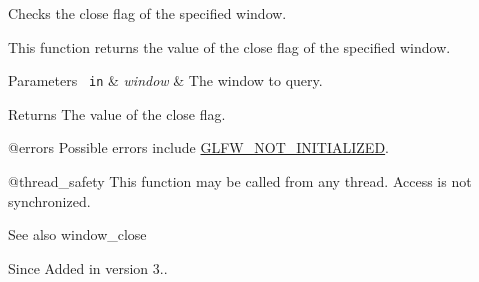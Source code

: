 Checks the close flag of the specified window. 

This function returns the value of the close flag of the specified window.


\begin{DoxyParams}[1]{Parameters}
\mbox{\texttt{ in}}  & {\em window} & The window to query. \\
\hline
\end{DoxyParams}
\begin{DoxyReturn}{Returns}
The value of the close flag.
\end{DoxyReturn}
@errors Possible errors include \mbox{\hyperlink{group__errors_ga2374ee02c177f12e1fa76ff3ed15e14a}{G\+L\+F\+W\+\_\+\+N\+O\+T\+\_\+\+I\+N\+I\+T\+I\+A\+L\+I\+Z\+ED}}.

@thread\+\_\+safety This function may be called from any thread. Access is not synchronized.

\begin{DoxySeeAlso}{See also}
window\+\_\+close
\end{DoxySeeAlso}
\begin{DoxySince}{Since}
Added in version 3.. 
\end{DoxySince}
